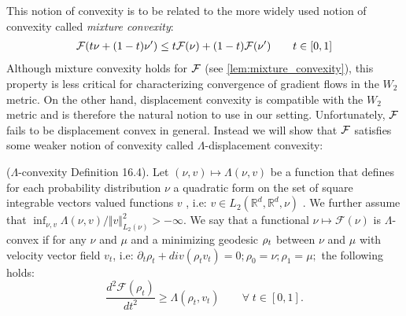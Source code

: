 This notion of convexity is to be related to the more widely used notion of convexity called \textit{mixture convexity}:
\begin{align}
	{{\mathcal F}}(t\nu +(1-t)\nu')\leq t{{\mathcal F}}(\nu)+(1-t){{\mathcal F}}(\nu') \qquad t\in [0,1]
\end{align}
Although mixture convexity holds for ${{\mathcal F}}$ (see \cref{lem:mixture_convexity}), this property is less critical for characterizing convergence of gradient flows in the $W_2$ metric. On the other hand, displacement convexity is compatible with the $W_2$ metric \cite{Bottou:2017} and is therefore the natural notion to use in our setting. Unfortunately, ${{\mathcal F}}$ fails to be displacement convex in general. Instead we will show that ${{\mathcal F}}$ satisfies some weaker notion of convexity called $\Lambda$-displacement convexity:
%
\begin{definition}\label{def:lambda-convexity}
($\Lambda$-convexity \cite{Villani:2009} Definition 16.4). Let $(\nu,v)\mapsto\Lambda(\nu,v)$
be a function that defines for each probability distribution $\nu$
a quadratic form on the set of square integrable vectors valued functions
$v$ , i.e: $v\in L_{2}(\mathbb{R}^{d},\mathbb{R}^{d},\nu)$ . We
further assume that $\inf_{\nu,v}\Lambda(\nu,v)/\Vert v\Vert_{L_{2}(\nu)}^{2}>-\infty$.
We say that a functional $\nu\mapsto\mathcal{F}(\nu)$ is $\Lambda$-convex
if for any $\nu$ and $\mu$ and a minimizing geodesic $\text{\ensuremath{\rho_{t}}}$
between $\nu$ and $\mu$ with velocity vector field $v_{t}$, i.e:
$\partial_{t}\rho_{t}+div(\rho_{t}v_{t})=0;\rho_{0}=\nu;\rho_{1}=\mu;$
the following holds:
\begin{equation*}
\frac{d^{2}\mathcal{F}(\rho_{t})}{dt^{2}}\geq\Lambda(\rho_{t},v_{t})\qquad\forall\; t\in[0,1].
\end{equation*}
\end{definition}

